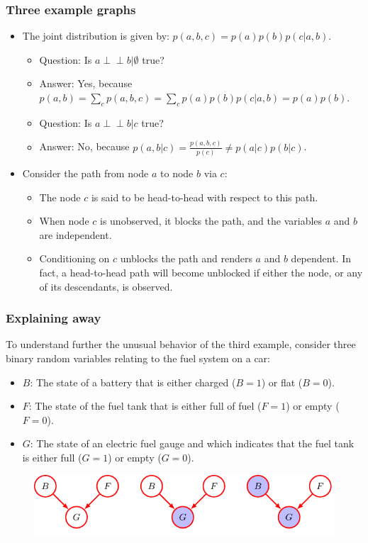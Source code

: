 \documentclass{beamer}
\newcommand{\ind}{\perp\!\!\!\!\perp}
\begin{document}
\begin{frame}
    \frametitle{Three example graphs}
    \begin{itemize}
        \item The joint distribution is given by: $p(a,b,c)=p(a)p(b)p(c|a,b)$.
        \begin{itemize}
            \item Question: Is $a\ind{}b|\emptyset$ true?
            \item Answer: Yes, because $p(a,b)=\sum_{c}p(a,b,c)=\sum_{c}p(a)p(b)p(c|a,b)=p(a)p(b)$.
            \item Question: Is $a\ind{}b|c$ true?
            \item Answer: No, because $p(a,b|c)=\frac{p(a,b,c)}{p(c)}\ne{}p(a|c)p(b|c)$.
        \end{itemize}
        \item Consider the path from node $a$ to node $b$ via $c$:
        \begin{itemize}
            \item The node $c$ is said to be head-to-head with respect to this path.
            \item When node $c$ is unobserved, it blocks the path, and the variables $a$ and $b$ are independent.
            \item Conditioning on $c$ unblocks the path and renders $a$ and $b$ dependent. In fact, a head-to-head path will become unblocked if either the node, or any of its descendants, is observed.
        \end{itemize}
    \end{itemize}
\end{frame}

\begin{frame}
    \frametitle{Explaining away}
    To understand further the unusual behavior of the third example, consider three binary random variables relating to the fuel system on a car:
    \begin{itemize}
        \item $B$: The state of a battery that is either charged ($B=1$) or flat ($B=0$).
        \item $F$: The state of the fuel tank that is either full of fuel ($F=1$) or empty ($F=0$).
        \item $G$: The state of an electric fuel gauge and which indicates that the fuel tank is either full ($G=1$) or empty ($G=0$).
    \end{itemize}
    \begin{figure}
        \includegraphics{Figure_20.pdf}
    \end{figure}
\end{frame}
\end{document}

